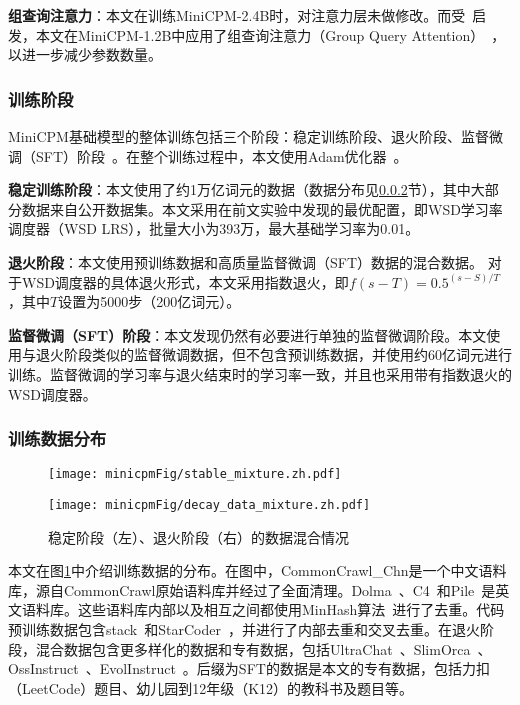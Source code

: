 \noindent\textbf{组查询注意力}：本文在训练MiniCPM-2.4B时，对注意力层未做修改。而受~\cite{liu2024mobilellm}启发，本文在MiniCPM-1.2B中应用了组查询注意力（Group Query Attention）~\citep{ainslie-etal-2023-gqa}，以进一步减少参数数量。

\subsubsection{训练阶段}
MiniCPM基础模型的整体训练包括三个阶段：稳定训练阶段、退火阶段、监督微调（SFT）阶段~\citep{zhang2023instruction,wei2021finetuned}。在整个训练过程中，本文使用Adam优化器~\citep{kingma2014adam}。 

\textbf{稳定训练阶段}：本文使用了约1万亿词元的数据（数据分布见\ref{sec:appdatadistrbution}节），其中大部分数据来自公开数据集。本文采用在前文实验中发现的最优配置，即WSD学习率调度器（WSD LRS），批量大小为393万，最大基础学习率为0.01。

\textbf{退火阶段}：本文使用预训练数据和高质量监督微调（SFT）数据的混合数据。
对于WSD调度器的具体退火形式，本文采用指数退火，即$f(s-T)=  0.5^{(s-S)/T}$，其中$T$设置为5000步（200亿词元）。

\textbf{监督微调（SFT）阶段}：本文发现仍然有必要进行单独的监督微调阶段。本文使用与退火阶段类似的监督微调数据，但不包含预训练数据，并使用约60亿词元进行训练。监督微调的学习率与退火结束时的学习率一致，并且也采用带有指数退火的WSD调度器。 


\subsubsection{训练数据分布}
\label{sec:appdatadistrbution}

\begin{figure}[htbp]
    \centering
    \begin{minipage}{0.48\linewidth}
        \centering
        \texttt{[image: minicpmFig/stable\_mixture.zh.pdf]}
    \end{minipage}
    \hfill 
    \begin{minipage}{0.48\linewidth}
        \centering
        \texttt{[image: minicpmFig/decay\_data\_mixture.zh.pdf]}
    \end{minipage}
    \caption{稳定阶段（左）、退火阶段（右）的数据混合情况}
        \label{fig:appdatamixture}
\end{figure}

本文在图\ref{fig:appdatamixture}中介绍训练数据的分布。在图中，CommonCrawl\_Chn是一个中文语料库，源自CommonCrawl原始语料库并经过了全面清理。Dolma~\citep{dolma}、C4~\citep{2019t5}和Pile~\citep{gao2020pile, biderman2022datasheet}是英文语料库。这些语料库内部以及相互之间都使用MinHash算法~\citep{broder1997resemblance}进行了去重。代码预训练数据包含stack~\citep{Kocetkov2022TheStack}和StarCoder~\cite{li2023starcoder}，并进行了内部去重和交叉去重。在退火阶段，混合数据包含更多样化的数据和专有数据，包括UltraChat~\citep{ding2023enhancing}、SlimOrca~\citep{SlimOrca, SlimOrcaDedup}、OssInstruct~\citep{wei2023magicoder}、EvolInstruct~\citep{xu2023wizardlm}。后缀为SFT的数据是本文的专有数据，包括力扣（LeetCode）题目、幼儿园到12年级（K12）的教科书及题目等。 


